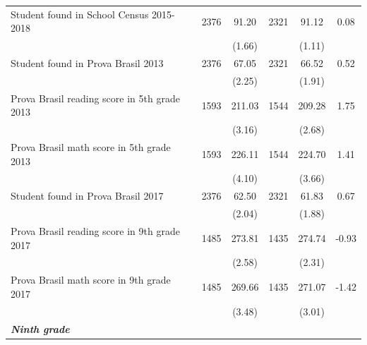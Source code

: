\documentclass[
	article,			%
	12pt,				%
	oneside,			%
	a4paper,			%
	]{article}
\begin{document}
\begin{table}[h!]
\begin{tabular}{lccccc}
Student found in School Census 2015-2018 &       2376 &      91.20 &       2321 &      91.12 &       0.08 \\

           &            &     (1.66) &            &     (1.11) &            \\

Student found in Prova Brasil 2013 &       2376 &      67.05 &       2321 &      66.52 &       0.52 \\

           &            &     (2.25) &            &     (1.91) &            \\

Prova Brasil reading score in 5th grade 2013 &       1593 &     211.03 &       1544 &     209.28 &       1.75 \\

           &            &     (3.16) &            &     (2.68) &            \\

Prova Brasil math score in 5th grade 2013 &       1593 &     226.11 &       1544 &     224.70 &       1.41 \\

           &            &     (4.10) &            &     (3.66) &            \\

Student found in Prova Brasil 2017 &       2376 &      62.50 &       2321 &      61.83 &       0.67 \\

           &            &     (2.04) &            &     (1.88) &            \\

Prova Brasil reading score in 9th grade 2017 &       1485 &     273.81 &       1435 &     274.74 &      -0.93 \\

           &            &     (2.58) &            &     (2.31) &            \\

Prova Brasil math score in 9th grade 2017 &       1485 &     269.66 &       1435 &     271.07 &      -1.42 \\

           &            &     (3.48) &            &     (3.01) &            \\

{\it {\bf Ninth grade}} &            &            &            &            &            \\


\end{tabular}
\end{table}
\end{document}
